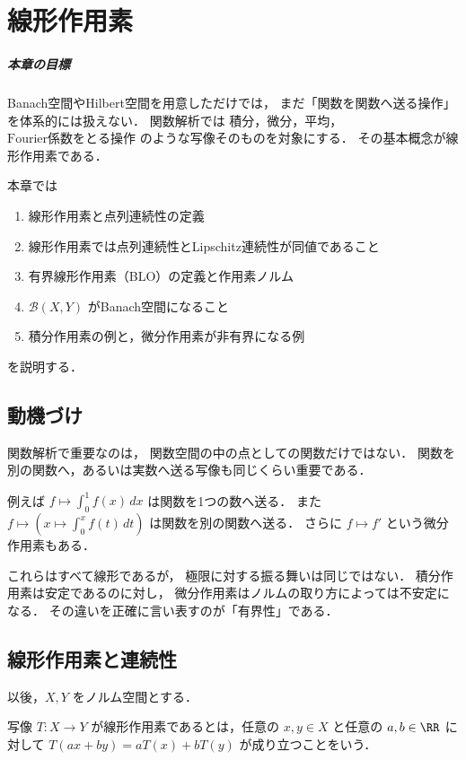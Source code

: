 \setcounter{chapter}{13}
\chapter{線形作用素}

\paragraph{本章の目標}
Banach空間やHilbert空間を用意しただけでは，
まだ「関数を関数へ送る操作」を体系的には扱えない．
関数解析では
$\text{積分}$，$\text{微分}$，$\text{平均}$，$\text{Fourier係数をとる操作}$
のような写像そのものを対象にする．
その基本概念が線形作用素である．

本章では
\begin{enumerate}
    \item 線形作用素と点列連続性の定義
    \item 線形作用素では点列連続性とLipschitz連続性が同値であること
    \item 有界線形作用素（BLO）の定義と作用素ノルム
    \item $\mathcal B(X,Y)$ がBanach空間になること
    \item 積分作用素の例と，微分作用素が非有界になる例
\end{enumerate}
を説明する．

\section{動機づけ}

関数解析で重要なのは，
関数空間の中の点としての関数だけではない．
関数を別の関数へ，あるいは実数へ送る写像も同じくらい重要である．

例えば
$f\longmapsto \int_0^1 f(x)\,dx$ は関数を1つの数へ送る．
また
$f\longmapsto \left(x\mapsto \int_0^x f(t)\,dt\right)$ は関数を別の関数へ送る．
さらに
$f\longmapsto f'$ という微分作用素もある．

これらはすべて線形であるが，
極限に対する振る舞いは同じではない．
積分作用素は安定であるのに対し，
微分作用素はノルムの取り方によっては不安定になる．
その違いを正確に言い表すのが「有界性」である．

\section{線形作用素と連続性}

以後，$X,Y$ をノルム空間とする．

\begin{definition}[線形作用素]
写像 $T:X\to Y$ が線形作用素であるとは，任意の $x,y\in X$ と任意の $a,b\in\RR$ に対して
$T(ax+by)=aT(x)+bT(y)$ が成り立つことをいう．
\end{definition}

